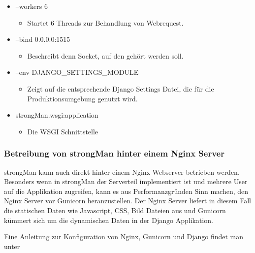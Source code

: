 \begin{itemize}
    \item --workers 6
    \begin{itemize}
        \item Startet 6 Threads zur Behandlung von Webrequest.
    \end{itemize}
    \item --bind 0.0.0.0:1515
    \begin{itemize}
        \item Beschreibt denn Socket, auf den gehört werden soll.
    \end{itemize}
    \item --env DJANGO\_SETTINGS\_MODULE
    \begin{itemize}
        \item Zeigt auf die entsprechende Django Settings Datei, die für die Produktionsumgebung genutzt wird.
    \end{itemize}
    \item strongMan.wsgi:application
    \begin{itemize}
        \item Die WSGI Schnittstelle
    \end{itemize}
\end{itemize}


\subsubsection{Betreibung von strongMan hinter einem Nginx Server}
strongMan kann auch direkt hinter einem Nginx Webserver betrieben werden. Besonders wenn in strongMan der Serverteil implementiert ist und mehrere User auf die Applikation zugreifen, kann es aus Performanzgründen Sinn machen, den Nginx Server vor Gunicorn heranzustellen. Der Nginx Server liefert in diesem Fall die statischen Daten wie Javascript, CSS, Bild Dateien aus und Gunicorn kümmert sich um die dynamischen Daten in der Django Applikation.

Eine Anleitung zur Konfiguration von Nginx, Gunicorn und Django findet man unter \cite{nginx-gunicorn}



